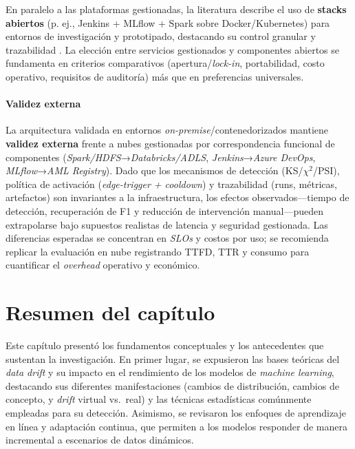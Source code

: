 En paralelo a las plataformas gestionadas, la literatura describe el uso de \textbf{stacks abiertos} (p. ej., Jenkins + MLflow + Spark sobre Docker/Kubernetes) para entornos de investigación y prototipado, destacando su control granular y trazabilidad \citep{RodriguezSimmhan2023,Kapoor2023,DeSousa2023}. La elección entre servicios gestionados y componentes abiertos se fundamenta en criterios comparativos (apertura/\textit{lock-in}, portabilidad, costo operativo, requisitos de auditoría) más que en preferencias universales.

\vspace{0.25em}

\paragraph{Validez externa}
La arquitectura validada en entornos \textit{on-premise}/contenedorizados mantiene \textbf{validez externa} frente a nubes gestionadas por correspondencia funcional de componentes (\textit{Spark/HDFS}→\textit{Databricks/ADLS}, \textit{Jenkins}→\textit{Azure DevOps}, \textit{MLflow}→\textit{AML Registry}). 
Dado que los mecanismos de detección (KS/$\chi^{2}$/PSI), política de activación (\textit{edge-trigger + cooldown}) y trazabilidad (runs, métricas, artefactos) son invariantes a la infraestructura, los efectos observados—tiempo de detección, recuperación de F1 y reducción de intervención manual—pueden extrapolarse bajo supuestos realistas de latencia y seguridad gestionada. 
Las diferencias esperadas se concentran en \textit{SLOs} y costos por uso; se recomienda replicar la evaluación en nube registrando TTFD, TTR y consumo para cuantificar el \textit{overhead} operativo y económico.


\section{Resumen del capítulo}

Este capítulo presentó los fundamentos conceptuales y los antecedentes que sustentan la investigación. En primer lugar, se expusieron las bases teóricas del \textit{data drift} y su impacto en el rendimiento de los modelos de \textit{machine learning}, destacando sus diferentes manifestaciones (cambios de distribución, cambios de concepto, y \textit{drift} virtual vs.\ real) y las técnicas estadísticas comúnmente empleadas para su detección. Asimismo, se revisaron los enfoques de aprendizaje en línea y adaptación continua, que permiten a los modelos responder de manera incremental a escenarios de datos dinámicos.

